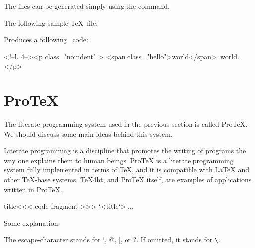\begin{texsource}
\end{texsource}

The  files can be generated simply using the  command.

The following sample \TeX\ file:


Produces a following \HTML\ code:

\begin{htmlsource}
<!--l. 4--><p class="noindent" >
<span class="hello">world</span> world. 
</p> 
\end{htmlsource}


\section{ProTeX}


The literate programming system used in the previous section is called ProTeX. We should discuss some main ideas behind this system.


Literate programming is a discipline that promotes the writing of programs the way one explains them to human beings. ProTeX is a literate programming system fully implemented in terms of TeX, and it is compatible with LaTeX and other TeX-base systems. TeX4ht, and ProTeX itself, are examples of applications written in ProTeX.


\begin{texsource}

\<title\><<<
code fragment
>>>  
`<title`>
\OutputCode\<...\> 
\end{texsource}

Some explanation:

\begin{texsource}

\end{texsource}

The escape-character stands for `, @, |, or ?. If omitted, it stands for \verb|\|. 


